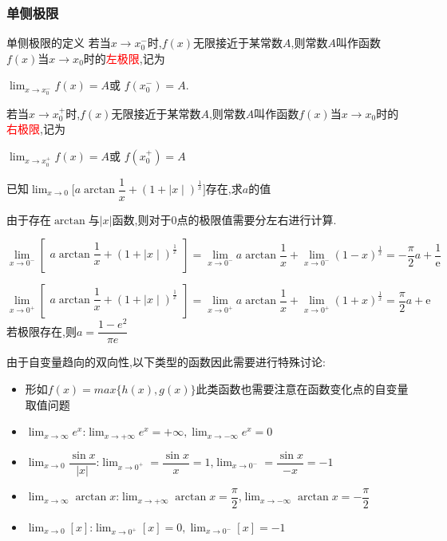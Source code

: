 \documentclass[8pt a4paper, oneside, UTF8]{ctexbook}
\begin{document}
\begin{sloppypar}
    \subsubsection{单侧极限}
    \begin{defn}{单侧极限的定义}{}
        若当$x\to x_0^{-}$时,$f(x)$无限接近于某常数$A$,则常数$A$叫作函数$f(x)$当$x\to x_0$时的\textcolor{red}{左极限},记为
        \begin{center}
            $\operatorname*{lim}_{x\to x_0^{-}}f(x)=A$或 $f(x_0^{-})=A$.
        \end{center}
        若当$x\to x_0^+$时,$f(x)$无限接近于某常数$A$,则常数$A$叫作函数$f(x)$当$x\to x_0$时的\textcolor{red}{右极限},记为
        \begin{center}
            $\operatorname*{lim}_{x\to x_0^{+}}f(x)=A$或 $f(x_0^{+})=A$
        \end{center}
    \end{defn}
    \begin{problem}
    $\text{已知}\lim_{x\to0}\biggl[a\arctan\dfrac{1}{x}+(1+\mid x\mid)^{\frac{1}{x}}\biggr]\text{存在,求}a\text{的值}$
    \end{problem}
    \begin{solution}
        由于存在$\arctan$与$|x|$函数,则对于0点的极限值需要分左右进行计算.

        $\lim\limits_{x\to0^{-}}\left[\begin{matrix}a\arctan\dfrac{1}{x}+(1+\mid x\mid)^{\frac{1}{x}}\\\end{matrix}\right]=\lim\limits_{x\to0^{-}}a\arctan\dfrac{1}{x}+\lim\limits_{x\to0^{-}}(1-x)^{\frac{1}{x}}=-\dfrac{\pi}{2}a+\dfrac{1}{\text{e}}$

        $\lim\limits_{x\to0^+}\left[\begin{matrix}a\arctan\dfrac{1}{x}+(1+\mid x\mid)^{\frac{1}{x}}\\\end{matrix}\right]=\lim\limits_{x\to0^+}a\arctan\dfrac{1}{x}+\lim\limits_{x\to0^+}(1+x)^{\frac{1}{x}}=\dfrac{\pi}{2}a+\mathrm{e}$
        若极限存在,则$a=\dfrac{1-e^2}{\pi e}$
    \end{solution}
    \begin{note}
        由于自变量趋向的双向性,以下类型的函数因此需要进行特殊讨论:
        \begin{itemize}
            \item 形如$f(x)=max\{h(x),g(x)\}$此类函数也需要注意在函数变化点的自变量取值问题
            \item $\lim_{x \to \infty}e^x$:$\lim _{x \to +\infty}e^x=+\infty,
                      \lim _{x \to -\infty}e^x=0$
            \item $\lim_{x \to 0} \dfrac{\sin x}{|x|}$:$\lim_{x \to 0^+}=\dfrac{\sin x}{x}=1$,$\lim_{x \to 0^-}=\dfrac{\sin x}{-x}=-1$
            \item $\lim_{x \to \infty }\arctan x$:$\lim_{x \to +\infty}\arctan x=\dfrac{\pi}{2}$,$\lim_{x \to -\infty}\arctan x= -\dfrac{\pi}{2}$
            \item $\lim_{x \to 0}[x]$:$\lim _{x \to 0^+}[x]=0,\lim_{x \to 0^-}[x]=-1$
        \end{itemize}
    \end{note}

\end{sloppypar}
\end{document}
